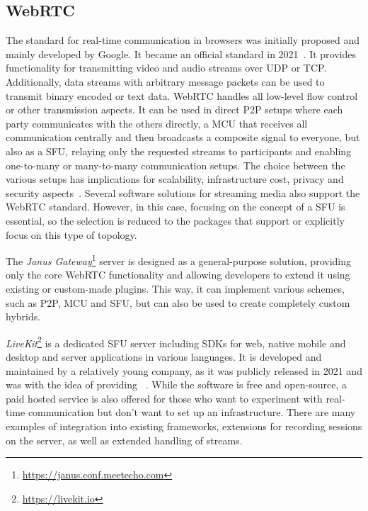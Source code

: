 \subsection{WebRTC}

The standard for real-time communication in browsers was initially proposed and mainly developed by Google.
It became an official standard in 2021~\parencite{webRtcOfficialWebStandard}.
It provides functionality for transmitting video and audio streams over \ac{UDP} or \ac{TCP}.
Additionally, data streams with arbitrary message packets can be used to transmit binary encoded or text data.
WebRTC handles all low-level flow control or other transmission aspects.
It can be used in direct \ac{P2P} setups where each party communicates with the others directly, a \ac{MCU} that receives all communication centrally and then broadcasts a composite signal to everyone, but also as a \ac{SFU}, relaying only the requested streams to participants and enabling one-to-many or many-to-many communication setups.
The choice between the various setups has implications for scalability, infrastructure cost, privacy and security aspects~\parencite{webRtcArchitectures}.
Several software solutions for streaming media also support the WebRTC standard.
However, in this case, focusing on the concept of a \ac{SFU} is essential, so the selection is reduced to the packages that support or explicitly focus on this type of topology.



The \emph{Janus Gateway}\footnote{\url{https://janus.conf.meetecho.com}} server is designed as a general-purpose solution, providing only the core \ac{WebRTC} functionality and allowing developers to extend it using existing or custom-made plugins.
This way, it can implement various schemes, such as \ac{P2P}, \ac{MCU} and \ac{SFU}, but can also be used to create completely custom hybrids.

\emph{LiveKit}\footnote{\url{https://livekit.io}} is a dedicated \ac{SFU} server including \ac{SDK}s for web, native mobile and desktop and server applications in various languages.
It is developed and maintained by a relatively young company, as it was publicly released in 2021 and was  with the idea of providing ~\parencite{livekitAbout}.
While the software is free and open-source, a paid hosted service is also offered for those who want to experiment with real-time communication but don't want to set up an infrastructure.
There are many examples of integration into existing frameworks, extensions for recording sessions on the server, as well as extended handling of streams.

